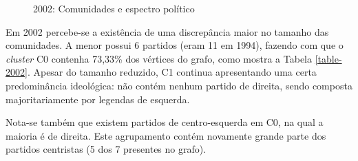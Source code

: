 \begin{figure}[H]
\center
    \qquad
    
    \caption{2002: Comunidades e espectro político}
\end{figure}

Em 2002 percebe-se a existência de uma discrepância maior no tamanho das comunidades. A menor possui 6 partidos (eram 11 em 1994), fazendo com que o \emph{cluster} C0 contenha 73,33\% dos vértices do grafo, como mostra a Tabela \ref{table-2002}. Apesar do tamanho reduzido, C1 continua apresentando uma certa predominância ideológica: não contém nenhum partido de direita, sendo composta majoritariamente por legendas de esquerda.

Nota-se também que existem partidos de centro-esquerda em C0, na qual a maioria é de direita. Este agrupamento contém novamente grande parte dos partidos centristas (5 dos 7 presentes no grafo). 

